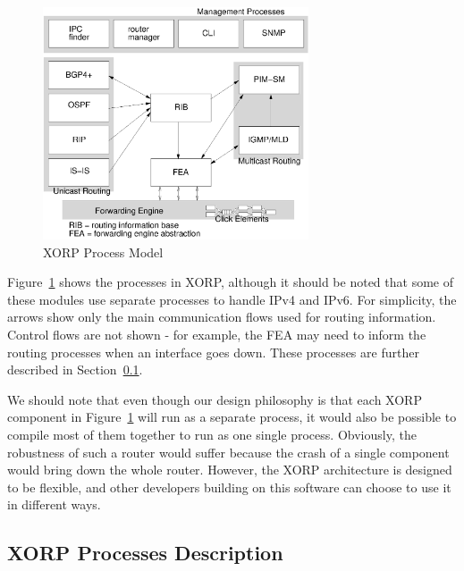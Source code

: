 \documentclass[11pt]{article}
\begin{document}
\begin{figure}[htbp]
  \begin{center}
    \includegraphics[width=0.7\textwidth]{figs/processes3.ps}
    \caption{XORP Process Model}
    \label{fig:process_model}
  \end{center}
\end{figure}

Figure~\ref{fig:process_model} shows the processes in XORP, although
it should be noted that some of these modules use separate processes
to handle IPv4 and IPv6. For simplicity, the arrows show only the
main communication flows used for routing information.  Control flows
are not shown - for example, the FEA may need to inform the routing
processes when an interface goes down. These processes are further
described in Section~\ref{sec:xorp_processes_description}.

We should note that even though our design philosophy is that each
XORP component in Figure~\ref{fig:process_model} will run as a
separate process, it would also be possible to compile most of them
together to run as one single process. Obviously, the robustness of
such a router would suffer because the crash of a single component
would bring down the whole router. However, the XORP architecture is
designed to be flexible, and other developers building on this
software can choose to use it in different ways.

\subsection{XORP Processes Description}
\label{sec:xorp_processes_description}
\end{document}
